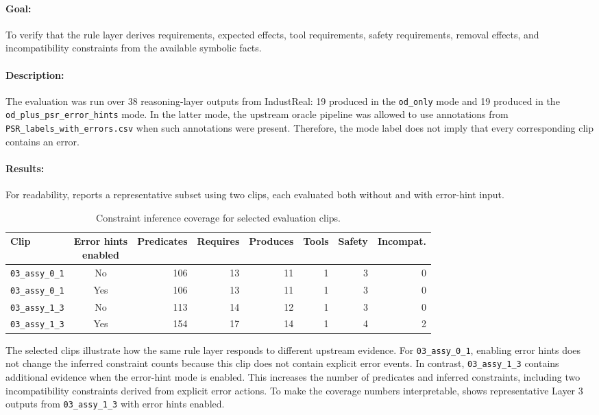 \paragraph{Goal:}
To verify that the rule layer derives requirements, expected effects, tool requirements, safety requirements, removal effects, and incompatibility constraints from the available symbolic facts. 

\paragraph{Description:}
The evaluation was run over 38 reasoning-layer outputs from IndustReal: 19 produced in the \texttt{od\_only} mode and 19 produced in the \texttt{od\_plus\_psr\_error\_hints} mode. In the latter mode, the upstream oracle pipeline was allowed to use annotations from \texttt{PSR\_labels\_with\_errors.csv} when such annotations were present. Therefore, the mode label does not imply that every corresponding clip contains an error.

\paragraph{Results:}
For readability,  reports a representative subset using
two clips, each evaluated both without and with error-hint input. 

\begin{table}[htbp]
\centering
\caption{Constraint inference coverage for selected evaluation clips.}
\label{tab:evaluation-constraint-coverage}
\small
\begin{tabular}{p{}crrrrrr}
\toprule
Clip & \makecell{Error hints\\enabled} & Predicates & Requires & Produces & Tools & Safety & Incompat. \\
\midrule
\texttt{03\_assy\_0\_1} & No  & 106 & 13 & 11 & 1 & 3 & 0 \\
\texttt{03\_assy\_0\_1} & Yes & 106 & 13 & 11 & 1 & 3 & 0 \\
\texttt{03\_assy\_1\_3} & No  & 113 & 14 & 12 & 1 & 3 & 0 \\
\texttt{03\_assy\_1\_3} & Yes & 154 & 17 & 14 & 1 & 4 & 2 \\
\bottomrule
\end{tabular}
\end{table}

The selected clips illustrate how the same rule layer responds to different
upstream evidence. For \texttt{03\_assy\_0\_1}, enabling error hints does not change
the inferred constraint counts because this clip does not contain explicit error
events. In contrast, \texttt{03\_assy\_1\_3} contains additional evidence when the
error-hint mode is enabled. This increases the number of predicates and inferred
constraints, including two incompatibility constraints derived from explicit
error actions. To make the coverage numbers interpretable,  shows representative Layer 3 outputs from \texttt{03\_assy\_1\_3} with error hints
enabled. 

